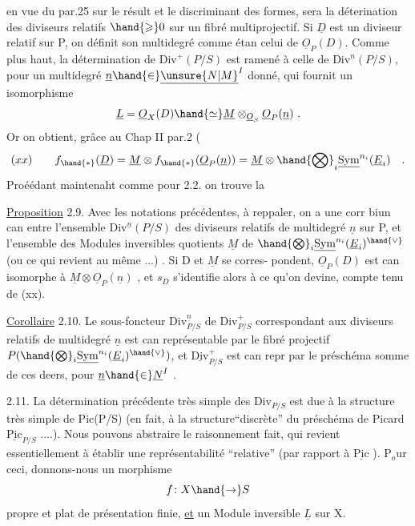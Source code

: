 
en vue du par.25 sur le résult  et le discriminant des formes, sera la
déterination des diviseurs relatifs $\hand{\geqslant} 0$ sur un fibré multiprojectif.
Si $\underline{D}$ est un diviseur relatif sur P, on définit son multidegré comme étan
celui de $\underline{O}_P(D)$. Comme plus haut, la détermination de $\mathrm{Div}^{+}(P/S)$ est ramené
à celle de $\mathrm{Div}^{\underline{n}}(P/S)$, pour un multidegré $\underline{n}\hand{\in}\underline{\unsure{N|M}}^{I}$ donné, qui fournit un
isomorphisme
\[ \underline{L} =\underline{O}_X(D) \hand{\simeq} \underline{M} \otimes_{\underline{O}_S} \underline{O}_P(\underline{n}) \ . \]
Or on obtient, grâce au Chap II par.2 (
\[ (xx) \qquad f_{\hand{*}}(\underline{D}) = \underline{M} \otimes f_{\hand{*}}(\underline{O}_P(\underline{n})) = \underline{M} \otimes \hand{\bigotimes}_i \underline{\mathrm{Sym}}^{n_i}(\underline{E}_i) \quad . \]
Proéédant maintenaht comme pour 2.2. on trouve la

\uline{Proposition} 2.9. Avec les notations précédentes, à reppaler, on a une
corr biun can entre l'ensemble $\mathrm{Div}^{\underline{n}}(P/S)$ des diviseurs relatifs de
multidegré $\underline{n}$ sur P, et l'ensemble des Modules inversibles quotients $\underline{M}$
de $\hand{\bigotimes}_i \underline{\mathrm{Sym}}^{n_i}(\underline{E}_i)^{\hand{\vee}}$ (ou ce qui revient au même ...) . Si D et $\underline{M}$ se corres-%
pondent, $\underline{O}_P(D)$ est can isomorphe à $\underline{M}\otimes\underline{O}_P(\underline{n})$ , et $s_D$ s'identifie alors
à ce qu'on devine, compte tenu de (xx).

\uline{Corollaire} 2.10. Le sous-foncteur $\mathrm{Div}^{\underline{n}}_{P/S}$ de $\mathrm{Div}^{+}_{P/S}$ correspondant aux
diviseurs relatifs de multidegré $\underline{n}$ est can représentable par le fibré
projectif $P(\hand{\bigotimes}_i \underline{\mathrm{Sym}}^{n_i}(\underline{E}_i)^{\hand{\vee}})$, et $\underline{\mathrm{Div}}^{+}_{P/S}$ est can repr par le préschéma
somme de ces deers, pour $\underline{n}\hand{\in}\underline{N}^{I}$ .

2.11. La détermination précédente très simple des $\mathrm{Div}_{P/S}$ est due à la
structure très simple de Pic(P/S) (en fait, à la structure``discrète'' du
préschéma de Picard $\underline{\mathrm{Pic}}_{P/S}$ ....). Nous pouvons abstraire le raisonnement
fait, qui revient essentiellement à établir une représentabilité ``relative''
(par rapport à $\underline{\mathrm{Pic}}$ ). P$_o$ur ceci, donnons-nous un morphisme
\[ f\colon X \hand{\to} S \]
propre et plat de présentation finie, \uline{et} un Module inversible $\underline{L}$ sur X.

